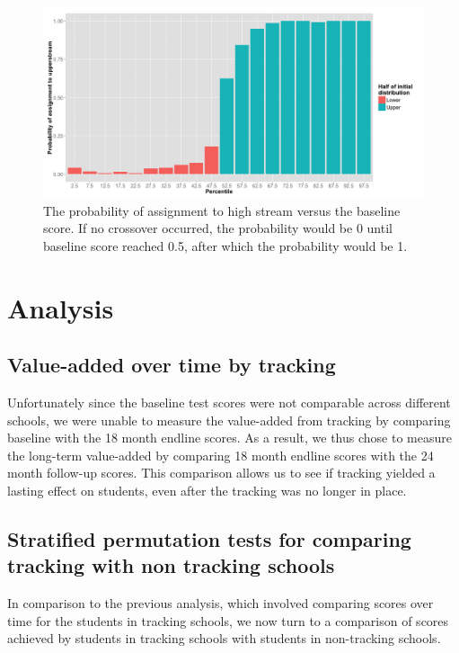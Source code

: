 \documentclass[11pt]{article}
\begin{document}
  
  \begin{figure}[H]
 \centering
 \includegraphics[scale=0.3]{tmt_assignment.png}
 \caption{The probability of assignment to high stream versus the baseline score. If no crossover occurred, the probability would be 0 until baseline score reached 0.5, after which the probability would be 1.}
 \label{fig:crossover}
 \end{figure} 
 
 
 \section{Analysis}
 \subsection{Value-added over time by tracking}
Unfortunately since the baseline test scores were not comparable across different schools, we were unable to measure the value-added from tracking by comparing baseline with the 18 month endline scores. As a result, we thus chose to measure the long-term value-added by comparing 18 month endline scores with the 24 month follow-up scores. This comparison allows us to see if tracking yielded a lasting effect on students, even after the tracking was no longer in place.



 \subsection{Stratified permutation tests for comparing tracking with non tracking schools}
In comparison to the previous analysis, which involved comparing scores over time for the students in tracking schools, we now turn to a comparison of scores achieved by students in tracking schools with students in non-tracking schools.
 
\end{document}
